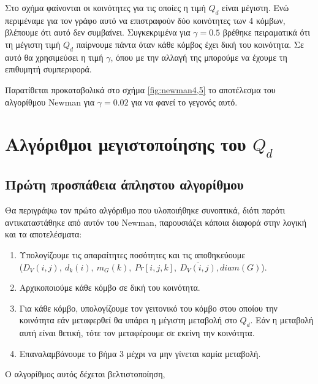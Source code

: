 \documentclass[12pt, letterpaper]{article}
\newcommand{\en}{\selectlanguage{english}}
\newcommand{\gr}{\selectlanguage{greek}}
\begin{document}
Στο σχήμα φαίνονται οι κοινότητες για τις οποίες η τιμή $Q_d$ είναι μέγιστη. Ενώ περιμέναμε για τον γράφο αυτό να επιστραφούν 
δύο κοινότητες των 4 κόμβων, βλέπουμε ότι αυτό δεν συμβαίνει. Συγκεκριμένα για $\gamma = 0.5$ βρέθηκε πειραματικά ότι 
τη μέγιστη τιμή $Q_d$ παίρνουμε πάντα όταν κάθε κόμβος έχει δική του κοινότητα. Σε αυτό θα χρησιμεύσει η τιμή $\gamma$, όπου με την 
αλλαγή της μπορούμε να έχουμε τη επιθυμητή συμπεριφορά.

Παρατίθεται προκαταβολικά στο σχήμα \ref{fig:newman4,5} το αποτέλεσμα του αλγορίθμου \textlatin{Newman} για $\gamma = 0.02$ για να φανεί 
το γεγονός αυτό.















\section{Αλγόριθμοι μεγιστοποίησης του $Q_d$}



\subsection{Πρώτη προσπάθεια άπληστου αλγορίθμου}

Θα περιγράψω τον πρώτο αλγόριθμο που υλοποιήθηκε συνοπτικά, διότι παρότι αντικαταστάθηκε 
από αυτόν του \en Newman, \gr παρουσιάζει κάποια διαφορά στην λογική και τα αποτελέσματα:

\begin{enumerate}
  \item Υπολογίζουμε τις απαραίτητες ποσότητες και τις αποθηκεύουμε \\ ($D_V(i,j), \ d_k(i), \ m_G(k), \ Pr[i,j,k],  \ \overline{D_V(i,j)},diam(G)$).
  \item Αρχικοποιούμε κάθε κόμβο σε δική του κοινότητα.
  \item Για κάθε κόμβο, υπολογίζουμε τον γειτονικό του κόμβο στου οποίου την κοινότητα 
  εάν μεταφερθεί θα υπάρει η μέγιστη μεταβολή στο $Q_d$. Εάν η μεταβολή αυτή είναι θετική,
  τότε τον μεταφέρουμε σε εκείνη την κοινότητα.
  \item Επαναλαμβάνουμε το βήμα 3 μέχρι να μην γίνεται καμία μεταβολή.
\end{enumerate}

Ο αλγορίθμος αυτός δέχεται βελτιστοποίηση, 
\end{document}
